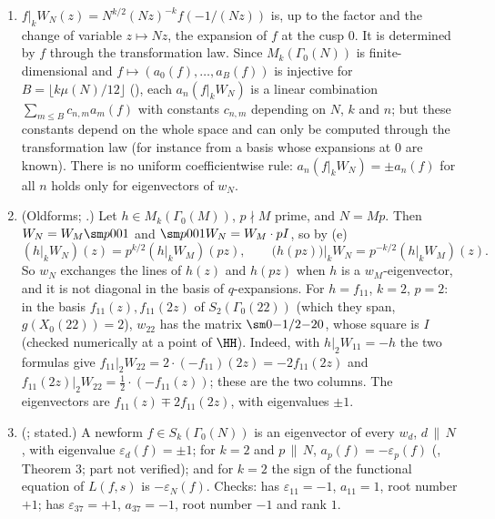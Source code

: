\begin{example}\label{ex:modforms:atkin-lehner-q-expansions}
\begin{enumerate}[label=(\alph*)]
\item $f|_kW_N(z)=N^{k/2}(Nz)^{-k}f(-1/(Nz))$ is, up to the factor and the change of variable $z\mapsto Nz$, the expansion of $f$ at the cusp $0$. It is determined by $f$ through the
transformation law. Since $M_k(\Gamma_0(N))$ is finite-dimensional and $f\mapsto(a_0(f),\dots,a_B(f))$ is injective for $B=\lfloor k\mu(N)/12\rfloor$ (), each
$a_n(f|_kW_N)$ is a linear combination $\sum_{m\le B}c_{n,m}a_m(f)$ with constants $c_{n,m}$ depending on $N$, $k$ and $n$; but these constants depend on the whole space and can only be
computed through the transformation law (for instance from a basis whose expansions at $0$ are known). There is no uniform coefficientwise rule: $a_n(f|_kW_N)=\pm a_n(f)$ for all $n$ holds
only for eigenvectors of $w_N$.
\item (Oldforms; .) Let $h\in M_k(\Gamma_0(M))$, $p\nmid M$ prime, and $N=Mp$. Then $W_N=W_M\sm p001$ and $\sm p001W_N=W_M\cdot pI$, so by (e)
\[
(h|_kW_N)(z)=p^{k/2}(h|_kW_M)(pz),\qquad\bigl(h(pz)\bigr)\big|_kW_N=p^{-k/2}(h|_kW_M)(z).
\]
So $w_N$ exchanges the lines of $h(z)$ and $h(pz)$ when $h$ is a $w_M$-eigenvector, and it is not diagonal in the basis of $q$-expansions. For $h=f_{11}$, $k=2$, $p=2$: in the basis
$f_{11}(z),f_{11}(2z)$ of $S_2(\Gamma_0(22))$ (which they span, $g(X_0(22))=2$), $w_{22}$ has the matrix $\sm0{-1/2}{-2}0$, whose square is $I$ (checked numerically at a point of $\HH$).
Indeed, with $h|_2W_{11}=-h$ the two formulas give $f_{11}|_2W_{22}=2\cdot(-f_{11})(2z)=-2f_{11}(2z)$ and $f_{11}(2z)|_2W_{22}=\frac12\cdot(-f_{11}(z))$; these are the two columns.
The eigenvectors are $f_{11}(z)\mp2f_{11}(2z)$, with eigenvalues $\pm1$.
\item (; stated.) A newform $f\in S_k(\Gamma_0(N))$ is an eigenvector of every $w_d$, $d\,\|\,N$, with eigenvalue $\varepsilon_d(f)=\pm1$; for $k=2$ and $p\,\|\,N$,
$a_p(f)=-\varepsilon_p(f)$ (\cite{AtkinLehner70}, Theorem 3; part not verified); and for $k=2$ the sign of the functional equation of $L(f,s)$ is $-\varepsilon_N(f)$. Checks:  has $\varepsilon_{11}=-1$,
$a_{11}=1$, root number $+1$;  has $\varepsilon_{37}=+1$, $a_{37}=-1$, root number $-1$ and rank $1$.
\end{enumerate}
\end{example}

